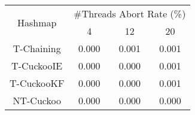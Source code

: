 \begin{tabular}{|c|c|c|c|}
\hline
\multirow{2}{*}{Hashmap} & \multicolumn{3}{c|}{\#Threads Abort Rate (\%)}\\\cline{2-4}& 4 & 12 & 20\\
\hline
\hline
T-Chaining & 0.000 & 0.001 & 0.001\\
T-CuckooIE & 0.000 & 0.000 & 0.001\\
T-CuckooKF & 0.000 & 0.000 & 0.001\\
NT-Cuckoo & 0.000 & 0.000 & 0.000\\
\hline
\end{tabular}
